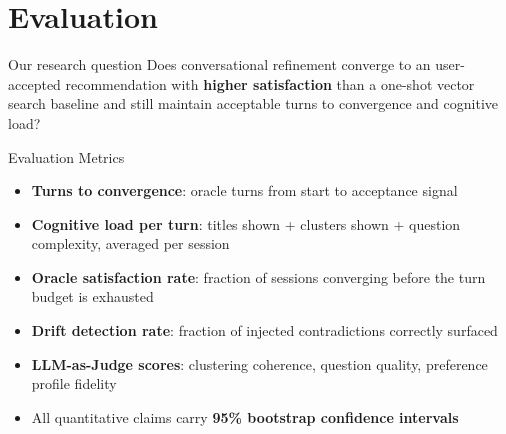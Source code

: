 \section{Evaluation}

\begin{frame}{Our research question}
    Does conversational refinement converge to an user-accepted recommendation with \textbf{higher satisfaction} 
    than a one-shot vector search baseline and still maintain acceptable turns to convergence and cognitive load?
\end{frame}



\begin{frame}{Evaluation Metrics}
  \begin{itemize}
    \item \textbf{Turns to convergence}: oracle turns from start to acceptance signal
    \item \textbf{Cognitive load per turn}: titles shown + clusters shown + question complexity, averaged per session
    \item \textbf{Oracle satisfaction rate}: fraction of sessions converging before the turn budget is exhausted
    \item \textbf{Drift detection rate}: fraction of injected contradictions correctly surfaced
    \item \textbf{LLM-as-Judge scores}: clustering coherence, question quality, preference profile fidelity
    \item All quantitative claims carry \textbf{95\% bootstrap confidence intervals}
  \end{itemize}
\end{frame}

